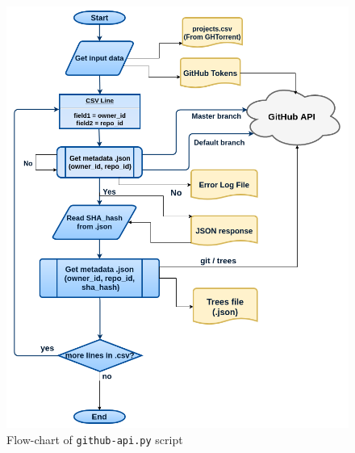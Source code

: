 \documentclass[a4paper, 12pt]{book}
\begin{document}
\begin{figure}
  \centering
  \includegraphics[width=14cm, keepaspectratio]{img/github-api}
  \caption{Flow-chart of \texttt{github-api.py} script}
  \label{fig:gh-api-diagram}
\end{figure}
\end{document}
